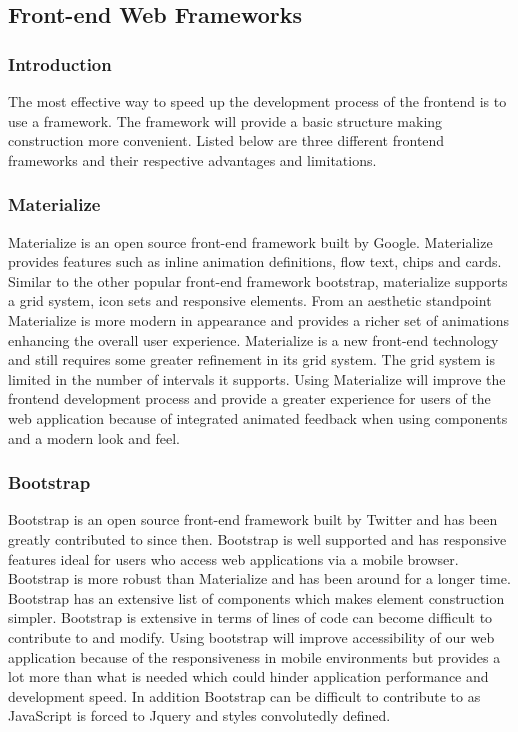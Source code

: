 \documentclass[onecolumn, draftclsnofoot,10pt, compsoc]{IEEEtran}
\begin{document}
\subsection{Front-end Web Frameworks}
\subsubsection{Introduction}
The most effective way to speed up the development process of the frontend is to use a framework. The framework will provide a basic structure making construction more convenient. Listed below are three different frontend frameworks and their respective advantages and limitations. 
\subsubsection{Materialize}
Materialize is an open source front-end framework built by Google. Materialize provides features such as inline animation definitions, flow text, chips and cards. Similar to the other popular front-end framework bootstrap, materialize supports a grid system, icon sets and responsive elements. From an aesthetic standpoint Materialize is more modern in appearance and provides a richer set of animations enhancing the overall user experience. Materialize is a new front-end technology and still requires some greater refinement in its grid system. The grid system is limited in the number of intervals it supports. Using Materialize will improve the frontend development process and provide a greater experience for users of the web application because of integrated animated feedback when using components and a modern look and feel. 
\subsubsection{Bootstrap}
Bootstrap is an open source front-end framework built by Twitter and has been greatly contributed to since then. Bootstrap is well supported and has responsive features ideal for users who access web applications via a mobile browser. Bootstrap is more robust than Materialize and has been around for a longer time. Bootstrap has an extensive list of components which makes element construction simpler. Bootstrap is extensive in terms of lines of code can become difficult to contribute to and modify. Using bootstrap will improve accessibility of our web application because of the responsiveness in mobile environments but provides a lot more than what is needed which could hinder application performance and development speed. In addition Bootstrap can be difficult to contribute to as JavaScript is forced to Jquery and styles convolutedly defined. 
\end{document}
